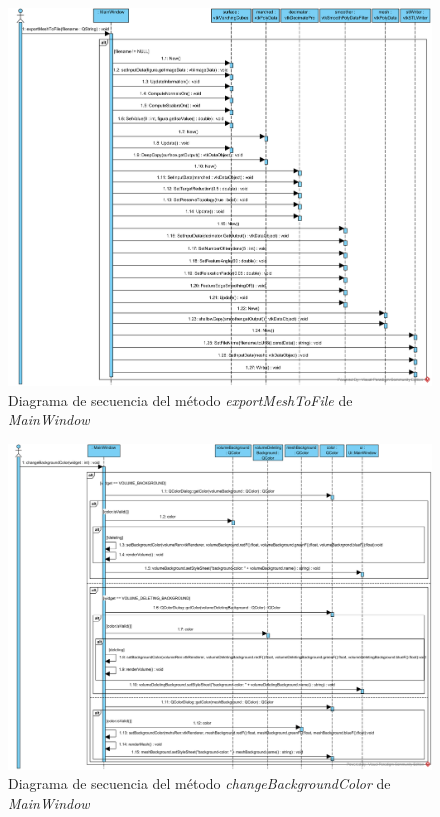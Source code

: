 \begin{figure}[H]
	\centering
	\includegraphics[angle=90,width=12cm]{imagenes/diagramas/secuencia/MainWindow_ExportMeshToFile}
	\caption{Diagrama de secuencia del método \textit{exportMeshToFile} de \textit{MainWindow}}
	\label{fig:diagrama_secuencia_mainwindow_exportmeshtofile}
\end{figure}

\begin{figure}[H]
	\centering
	\includegraphics[angle=90,width=12cm]{imagenes/diagramas/secuencia/MainWindow_ChangeBackgroundColor}
	\caption{Diagrama de secuencia del método \textit{changeBackgroundColor} de \textit{MainWindow}}
	\label{fig:diagrama_secuencia_mainwindow_changeBackgroundColor}
\end{figure}

